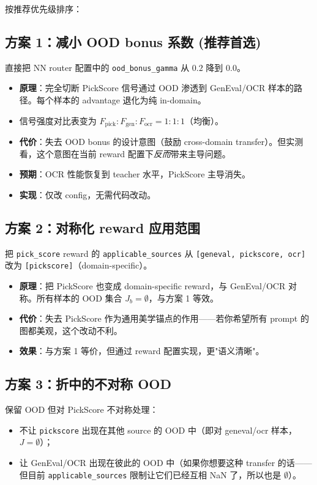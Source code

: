 \documentclass[11pt,a4paper]{article}
\begin{document}
按推荐优先级排序：

\subsection{\textcolor{green!50!black}{方案 1：减小 OOD bonus 系数 (推荐首选)}}

直接把 NN router 配置中的 \texttt{ood\_bonus\_gamma} 从 $0.2$ 降到 $0.0$。

\begin{itemize}
    \item \textbf{原理}：完全切断 PickScore 信号通过 OOD 渗透到 GenEval/OCR 样本的路径。每个样本的 advantage 退化为纯 in-domain。
    \item 信号强度对比表变为 $F_{\text{pick}} : F_{\text{gen}} : F_{\text{ocr}} = 1 : 1 : 1$（均衡）。
    \item \textbf{代价}：失去 OOD bonus 的设计意图（鼓励 cross-domain transfer）。但实测看，这个意图在当前 reward 配置下\emph{反而}带来主导问题。
    \item \textbf{预期}：OCR 性能恢复到 teacher 水平，PickScore 主导消失。
    \item \textbf{实现}：仅改 config，无需代码改动。
\end{itemize}

\subsection{方案 2：对称化 reward 应用范围}

把 \texttt{pick\_score} reward 的 \texttt{applicable\_sources} 从 \texttt{[geneval, pickscore, ocr]} 改为 \texttt{[pickscore]}（domain-specific）。

\begin{itemize}
    \item \textbf{原理}：把 PickScore 也变成 domain-specific reward，与 GenEval/OCR 对称。所有样本的 OOD 集合 $J_b = \emptyset$，与方案 1 等效。
    \item \textbf{代价}：失去 PickScore 作为通用美学锚点的作用——若你希望所有 prompt 的图都美观，这个改动不利。
    \item \textbf{效果}：与方案 1 等价，但通过 reward 配置实现，更"语义清晰"。
\end{itemize}

\subsection{方案 3：折中的不对称 OOD}

保留 OOD 但对 PickScore 不对称处理：
\begin{itemize}
    \item 不让 \texttt{pickscore} 出现在其他 source 的 OOD 中（即对 geneval/ocr 样本，$J = \emptyset$）；
    \item 让 GenEval/OCR 出现在彼此的 OOD 中（如果你想要这种 transfer 的话——但目前 \texttt{applicable\_sources} 限制让它们已经互相 NaN 了，所以也是 $\emptyset$）。
\end{itemize}
\end{document}
